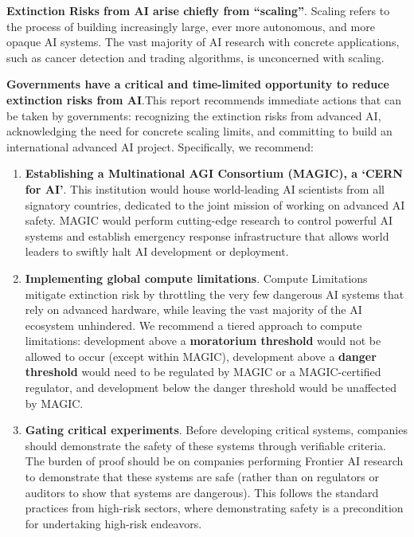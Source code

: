 \documentclass[12pt,a4paper]{article}
\begin{document}
\textbf{Extinction Risks from AI arise chiefly from “scaling”}. Scaling refers to the process of building increasingly large, ever more autonomous, and more opaque AI systems. The vast majority of AI research with concrete applications, such as cancer detection and trading algorithms, is unconcerned with scaling. 

\textbf{Governments have a critical and time-limited opportunity to reduce extinction risks from AI}.This report recommends immediate actions that can be taken by governments: recognizing the extinction risks from advanced AI, acknowledging the need for concrete scaling limits, and committing to build an international advanced AI project. Specifically, we recommend:

\begin{enumerate}
\item \textbf{Establishing a Multinational AGI Consortium (MAGIC), a ‘CERN for AI’}. This institution would house world-leading AI scientists from all signatory countries, dedicated to the joint mission of working on advanced AI safety. MAGIC would perform cutting-edge research to control powerful AI systems and establish emergency response infrastructure that allows world leaders to swiftly halt AI development or deployment. 
\item \textbf{Implementing global compute limitations}. Compute Limitations mitigate extinction risk by throttling the very few dangerous AI systems that rely on advanced hardware, while leaving the vast majority of the AI ecosystem unhindered. We recommend a tiered approach to compute limitations: development above a \textbf{moratorium threshold} would not be allowed to occur (except within MAGIC), development above a \textbf{danger threshold} would need to be regulated by MAGIC or a MAGIC-certified regulator, and development below the danger threshold would be unaffected by MAGIC. 
\item \textbf{Gating critical experiments}. Before developing critical systems, companies should demonstrate the safety of these systems through verifiable criteria. The burden of proof should be on companies performing Frontier AI research to demonstrate that these systems are safe (rather than on regulators or auditors to show that systems are dangerous). This follows the standard practices from high-risk sectors, where demonstrating safety is a precondition for undertaking high-risk endeavors.

\end{enumerate}
\end{document}
